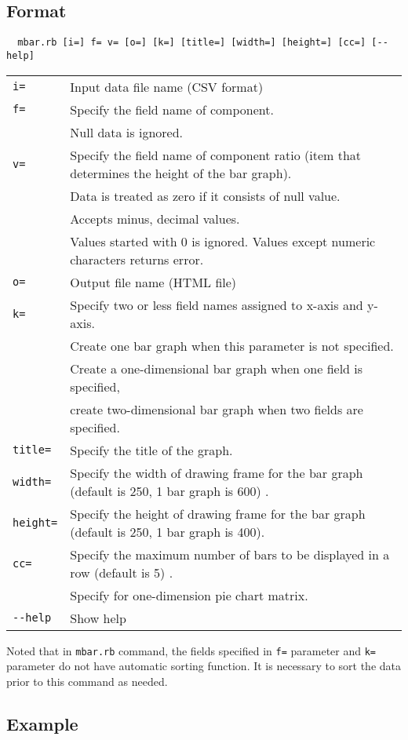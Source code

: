 \newpage
\subsection{Format}
\begin{verbatim}
  mbar.rb [i=] f= v= [o=] [k=] [title=] [width=] [height=] [cc=] [--help]
\end{verbatim}

\begin{table}[htbp]
{\small
\begin{tabular}{ll}
\verb|i=|        & Input data file name (CSV format) \\
\verb|f=|        & Specify the field name of component.   \\
                 & Null data is ignored. \\
\verb|v=|        & Specify the field name of component ratio (item that determines the height of the bar graph). \\
                 & Data is treated as zero if it consists of null value.  \\
                 & Accepts minus, decimal values.  \\
                 & Values started with 0 is ignored. Values except numeric characters returns error. \\
\verb|o=|        & Output file name (HTML file) \\
\verb|k=|        & Specify two or less field names assigned to x-axis and y-axis. \\
                 & Create one bar graph when this parameter is not specified. \\
 		 & Create a one-dimensional bar graph  when one field is specified, \\
                 & create two-dimensional bar graph when two fields are specified. \\
\verb|title=|    & Specify the title of the graph. \\
\verb|width=|    &  Specify the width of drawing frame for the bar graph  (default is 250, 1 bar graph is 600) .  \\
\verb|height=|   & Specify the height of drawing frame for the bar graph (default is 250, 1 bar graph is 400).  \\
\verb|cc=|       & Specify the maximum number of bars to be displayed in a row (default is 5) . \\
                 & Specify for one-dimension pie chart matrix.  \\
\verb|--help|    & Show help \\
\end{tabular} 
}
\end{table} 

Noted that in \verb|mbar.rb| command, 
the fields specified in \verb|f=| parameter  and \verb|k=| parameter do not have automatic sorting function. 
It is necessary to sort the data prior to this command as needed. 



\subsection{Example}


%

